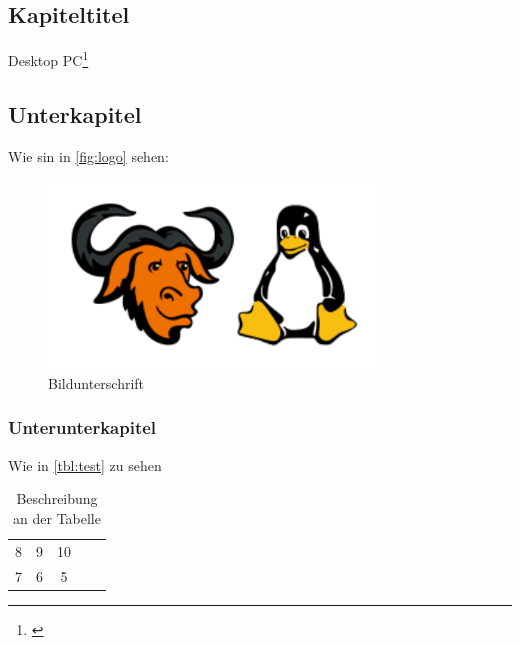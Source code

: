 \documentclass[
a4paper,   
titlepage,  
halfparskip,
12pt        
]{scrartcl}
\begin{document}
\begin{onehalfspacing} %
\pagestyle{fancy}
\fancyhf{} %
\fancyhead[L]{\leftmark} %
\fancyhead[R]{\thepage} %


\section{Kapiteltitel}
\label{sec:kap}
Desktop \acs{PC}\footnote{\cite[Crusher, W. (2014) S. 53]{quelle}}
\newpage
\subsection{Unterkapitel}
\label{subsec:kap}
Wie sin in \autoref{fig:logo} sehen: 
\begin{figure}[h]
  \centering
  \includegraphics[height=5.0cm]{logo}
  \caption[Beschreibung im Verzeichnis]{Bildunterschrift\footnotemark}
  \label{fig:logo}
\end{figure}
\newpage
\subsubsection{Unterunterkapitel}
\label{subsubsec:kap}
Wie in \autoref{tbl:test} zu sehen
\begin{table}[h]
\centering
  \begin{tabular}{ l | c | c | c | r }
  \hline
  8 & 9 & 10 \\
  7 & 6 & 5 \\
  \hline
  \end{tabular}
\caption[Beschreibung im Verzeichnis]{Beschreibung an der Tabelle\footnotemark}\label{tbl:test}
\end{table}


\appendix

\newpage


\end{onehalfspacing}
\end{document}
